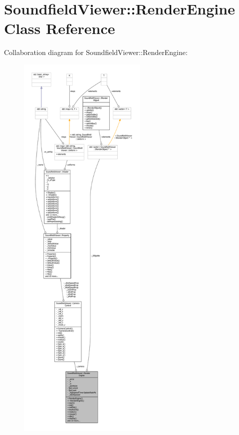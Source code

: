 \section{Soundfield\-Viewer\-:\-:Render\-Engine Class Reference}
\label{classSoundfieldViewer_1_1RenderEngine}


Collaboration diagram for Soundfield\-Viewer\-:\-:Render\-Engine\-:
\nopagebreak
\begin{figure}[H]
\begin{center}
\leavevmode
\includegraphics[height=550pt]{d7/db3/classSoundfieldViewer_1_1RenderEngine__coll__graph}
\end{center}
\end{figure}
